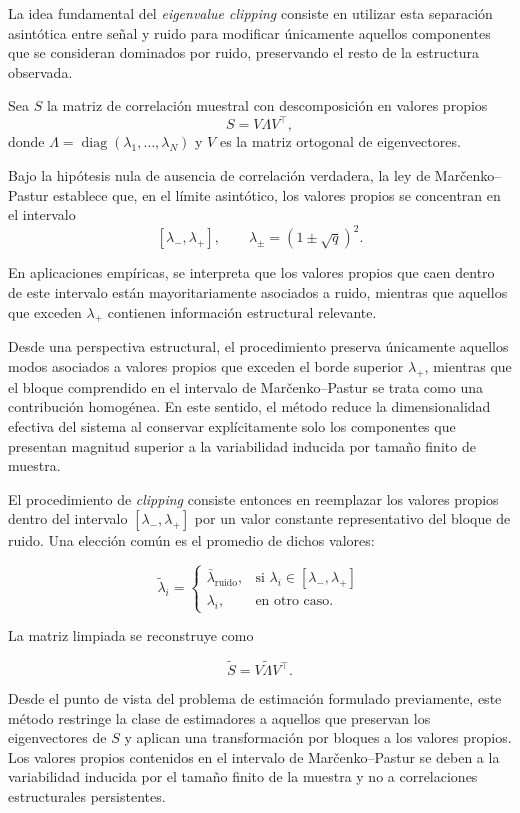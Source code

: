 \documentclass[letterpaper,12pt,oneside]{book}
\begin{document}
La idea fundamental del \textit{eigenvalue clipping} consiste en utilizar esta separación asintótica entre señal y ruido para modificar únicamente aquellos componentes que se consideran dominados por ruido, preservando el resto de la estructura observada.

Sea $S$ la matriz de correlación muestral con descomposición en valores propios
\[
S = V \Lambda V^\top,
\]
donde $\Lambda = \operatorname{diag}(\lambda_1,\dots,\lambda_N)$ y $V$ es la matriz ortogonal de eigenvectores.


Bajo la hipótesis nula de ausencia de correlación verdadera, la ley de Marčenko–Pastur establece que, en el límite asintótico, los valores propios se concentran en el intervalo
\[
[\lambda_-, \lambda_+], 
\qquad 
\lambda_{\pm} = (1 \pm \sqrt{q})^2.
\]

En aplicaciones empíricas, se interpreta que los valores propios que caen dentro de este intervalo están mayoritariamente asociados a ruido, mientras que aquellos que exceden $\lambda_+$ contienen información estructural relevante.

Desde una perspectiva estructural, el procedimiento preserva únicamente aquellos modos asociados a valores propios que exceden el borde superior $\lambda_+$, mientras que el bloque comprendido en el intervalo de Marčenko–Pastur se trata como una contribución homogénea. En este sentido, el método reduce la dimensionalidad efectiva del sistema al conservar explícitamente solo los componentes que presentan magnitud superior a la variabilidad inducida por tamaño finito de muestra.

El procedimiento de \textit{clipping} consiste entonces en reemplazar los valores propios dentro del intervalo $[\lambda_-,\lambda_+]$ por un valor constante representativo del bloque de ruido. Una elección común es el promedio de dichos valores:

\[
\tilde{\lambda}_i =
\begin{cases}
\bar{\lambda}_{\text{ruido}}, & \text{si } \lambda_i \in [\lambda_-,\lambda_+] \\
\lambda_i, & \text{en otro caso}.
\end{cases}
\]

La matriz limpiada se reconstruye como

\[
\tilde{S} = V \tilde{\Lambda} V^\top.
\]

Desde el punto de vista del problema de estimación formulado previamente, este método restringe la clase de estimadores a aquellos que preservan los eigenvectores de $S$ y aplican una transformación por bloques a los valores propios. Los valores propios contenidos en el intervalo de Marčenko–Pastur se deben a la variabilidad inducida por el tamaño finito de la muestra y no a correlaciones estructurales persistentes.
\end{document}
